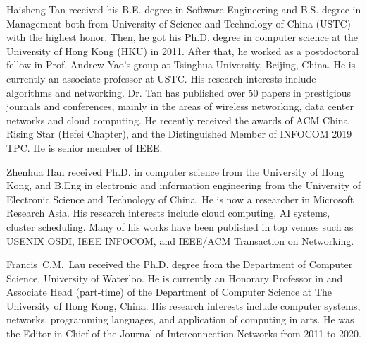 \begin{IEEEbiography}{Haisheng Tan}
    received his B.E. degree in Software Engineering and B.S. degree in Management both from University of Science and Technology of China (USTC) with the highest honor. Then, he got his Ph.D. degree in computer science at the University of Hong Kong (HKU) in 2011. After that, he worked as a postdoctoral fellow in Prof. Andrew Yao's group at Tsinghua University, Beijing, China. He is currently an associate professor at USTC. His research interests include algorithms and networking. Dr. Tan has published over 50 papers in prestigious journals and conferences, mainly in the areas of wireless networking, data center networks and cloud computing. He recently received the awards of ACM China Rising Star (Hefei Chapter), and the Distinguished Member of INFOCOM 2019 TPC. He is senior member of IEEE.
\end{IEEEbiography}
\vspace{-1cm}

\begin{IEEEbiography}{Zhenhua Han}
    received Ph.D. in computer science from the University of Hong Kong, and B.Eng in electronic and information engineering from the University of Electronic Science and Technology of China. He is now a researcher in Microsoft Research Asia. His research interests include cloud computing, AI systems, cluster scheduling. Many of his works have been published in top venues such as USENIX OSDI, IEEE INFOCOM, and IEEE/ACM Transaction on Networking.
\end{IEEEbiography}
\vspace{-1cm}

\begin{IEEEbiography}{Francis~C.M.~Lau}
    received the Ph.D. degree from the Department of Computer Science, University of Waterloo. He is currently an Honorary Professor in and Associate Head (part-time) of the Department of Computer Science at The University of Hong Kong, China. His research interests include computer systems, networks, programming languages, and application of computing in arts. He was the Editor-in-Chief of the Journal of Interconnection Networks from 2011 to 2020.
\end{IEEEbiography}
\vspace{-1cm}
